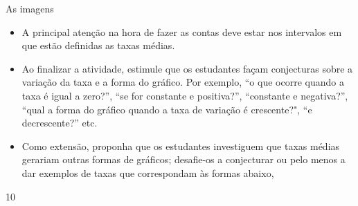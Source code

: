 \begin{sugestions}{As imagens}
{
\begin{itemize}

\item A principal atenção na hora de fazer as contas deve estar nos intervalos em que estão
definidas as taxas médias.
\item Ao finalizar a atividade, estimule que os estudantes façam conjecturas sobre a variação
da taxa e a forma do gráfico. Por exemplo, “o que ocorre quando a taxa é igual a zero?”,
“se for constante e positiva?”, “constante e negativa?”, “qual a forma do gráfico quando
a taxa de variação é crescente?", “e decrescente?” etc.
\item Como extensão, proponha que os estudantes investiguem que taxas médias gerariam
outras formas de gráficos; desafie-os a conjecturar ou pelo menos a dar exemplos de
taxas que correspondam às formas abaixo,

\begin{multicols}{5}
\begin{center}






\end{center}
\end{multicols}
\end{itemize}
}{1}{0}
\end{sugestions}
